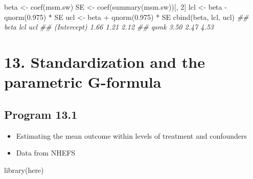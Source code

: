 \documentclass[
  10pt,
  a4paper,
]{book}
\newenvironment{Shaded}{\begin{snugshade}}{\end{snugshade}}
\newcommand{\DecValTok}[1]{\textcolor[rgb]{0.68,0.00,0.00}{#1}}
\newcommand{\DocumentationTok}[1]{\textcolor[rgb]{0.37,0.37,0.37}{\textit{#1}}}
\newcommand{\FloatTok}[1]{\textcolor[rgb]{0.68,0.00,0.00}{#1}}
\newcommand{\FunctionTok}[1]{\textcolor[rgb]{0.28,0.35,0.67}{#1}}
\newcommand{\NormalTok}[1]{\textcolor[rgb]{0.00,0.46,0.62}{#1}}
\newcommand{\OtherTok}[1]{\textcolor[rgb]{0.00,0.46,0.62}{#1}}
\newcommand{\SpecialCharTok}[1]{\textcolor[rgb]{0.37,0.37,0.37}{#1}}
\providecommand{\tightlist}{%
  \setlength{\itemsep}{0pt}\setlength{\parskip}{0pt}}
\begin{document}
\begin{Shaded}
\begin{Highlighting}[]
\NormalTok{beta }\OtherTok{\textless{}{-}} \FunctionTok{coef}\NormalTok{(msm.sw)}
\NormalTok{SE }\OtherTok{\textless{}{-}} \FunctionTok{coef}\NormalTok{(}\FunctionTok{summary}\NormalTok{(msm.sw))[, }\DecValTok{2}\NormalTok{]}
\NormalTok{lcl }\OtherTok{\textless{}{-}}\NormalTok{ beta }\SpecialCharTok{{-}} \FunctionTok{qnorm}\NormalTok{(}\FloatTok{0.975}\NormalTok{) }\SpecialCharTok{*}\NormalTok{ SE}
\NormalTok{ucl }\OtherTok{\textless{}{-}}\NormalTok{ beta }\SpecialCharTok{+} \FunctionTok{qnorm}\NormalTok{(}\FloatTok{0.975}\NormalTok{) }\SpecialCharTok{*}\NormalTok{ SE}
\FunctionTok{cbind}\NormalTok{(beta, lcl, ucl)}
\DocumentationTok{\#\#             beta  lcl  ucl}
\DocumentationTok{\#\# (Intercept) 1.66 1.21 2.12}
\DocumentationTok{\#\# qsmk        3.50 2.47 4.53}
\end{Highlighting}
\end{Shaded}

\hypertarget{standardization-and-the-parametric-g-formula}{%
\chapter*{13. Standardization and the parametric G-formula}\label{standardization-and-the-parametric-g-formula}}

\hypertarget{program-13.1}{%
\section{Program 13.1}\label{program-13.1}}

\begin{itemize}
\tightlist
\item
  Estimating the mean outcome within levels of treatment and confounders
\item
  Data from NHEFS
\end{itemize}

\begin{Shaded}
\begin{Highlighting}[]
\FunctionTok{library}\NormalTok{(here)}
\end{Highlighting}
\end{Shaded}
\end{document}
